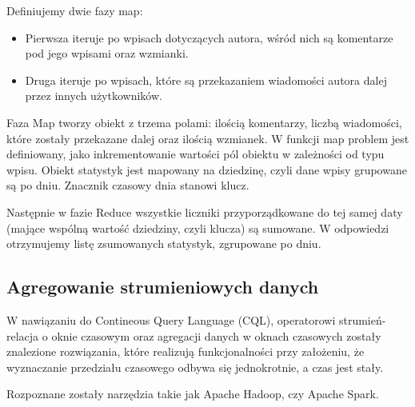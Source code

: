 

Definiujemy dwie fazy map:

\begin{itemize}[noitemsep]
\item Pierwsza iteruje po wpisach dotyczących autora, wśród nich są komentarze pod jego wpisami oraz wzmianki.
\item Druga iteruje po wpisach, które są przekazaniem wiadomości autora dalej przez innych użytkowników.
\end{itemize}

Faza Map tworzy obiekt z trzema polami: ilością komentarzy, liczbą wiadomości, które zostały przekazane dalej oraz ilością wzmianek. W funkcji map problem jest definiowany, jako inkrementowanie wartości pól obiektu w zależności od typu wpisu. Obiekt statystyk jest mapowany na dziedzinę, czyli dane wpisy grupowane są po dniu. Znacznik czasowy dnia stanowi klucz.

Następnie w fazie Reduce wszystkie liczniki przyporządkowane do tej samej daty (mające wspólną wartość dziedziny, czyli klucza) są sumowane. W odpowiedzi otrzymujemy listę zsumowanych statystyk, zgrupowane po dniu.

\subsection{Agregowanie strumieniowych danych}

W nawiązaniu do Contineous Query Language (CQL)\cite{stream-query-gorawski}, operatorowi strumień-relacja o oknie czasowym \cite{stream-query-stanford-stochmialek}\cite{stream-processing-streamsql} oraz agregacji danych w oknach czasowych zostały znalezione rozwiązania, które realizują funkcjonalności przy założeniu, że wyznaczanie przedziału czasowego odbywa się jednokrotnie, a czas jest stały.

Rozpoznane zostały narzędzia takie jak Apache Hadoop, czy Apache Spark.

